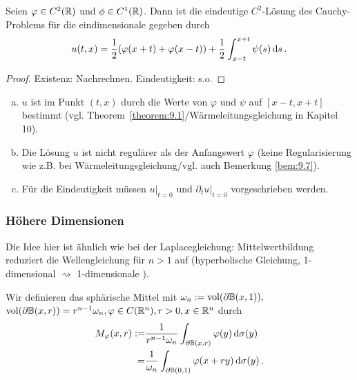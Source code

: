 \begin{theorem}
\label{theorem:9.2}
Seien $\varphi \in C^2(\mathbb{R})$ und $\phi \in C^1(\mathbb{R})$. Dann ist die eindeutige $C^2$-Lösung des Cauchy-Problems für die eindimensionale  gegeben durch
\[
	u(t,x) = \frac 1 2 (\varphi(x+t) + \varphi(x-t)) + \frac 1 2 \int_{x-t}^{x+t} \psi (s) \,\mathrm{d} s \, .
\]
\end{theorem}

\begin{proof}
Existenz: Nachrechnen. Eindeutigkeit: s.o.
\end{proof}

\begin{bem}
\label{bem:9.3}
\begin{enumerate}[(a)]
\item $u$ ist im Punkt $(t,x)$ durch die Werte von $\varphi$ und $\psi$ auf $[x-t,x+t]$ bestimmt (vgl. Theorem~\ref{theorem:9.1}/Wärmeleitungsgleichung in Kapitel 10).
\item Die Lösung $u$ ist nicht regulärer als der Anfangswert $\varphi$ (keine Regularisierung wie z.B. bei Wärmeleitungsgleichung/vgl. auch Bemerkung \ref{bem:9.7}).
\item Für die Eindeutigkeit müssen $u|_{t = 0} $ und $\partial_t u|_{t = 0}$ vorgeschrieben werden.
\end{enumerate}
\end{bem}

\subsubsection{Höhere Dimensionen}

Die Idee hier ist ähnlich wie bei der Laplacegleichung: Mittelwertbildung reduziert die Wellengleichung für $n>1$ auf  (hyperbolische Gleichung, 1-dimensional $\rightsquigarrow$ 1-dimensionale ).

\begin{defi}
Wir definieren das sphärische Mittel mit $\omega_n := \operatorname{vol} (\partial \mathbb{B}(x,1)),$ $ \operatorname{vol} (\partial \mathbb{B} (x,r)) = r^{n-1} \omega_n, \varphi \in C(\mathbb{R}^n), r>0, x \in \mathbb{R}^n$ durch
\begin{align*}
	M_\varphi (x,r)  := & \frac 1{r^{n-1} \omega_n} \int_{\partial \mathbb{B} (x,r)} \varphi (y) \,\mathrm{d} \sigma(y) \\
	 = & \frac 1{\omega_n} \int_{\partial\mathbb{B}(0,1)} \varphi(x+ry) \,\mathrm{d} \sigma(y) \, .
\end{align*}
\end{defi}

